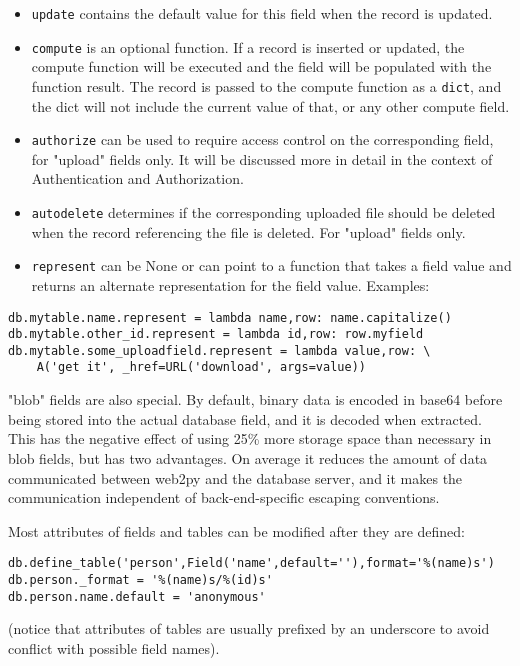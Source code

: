 \documentclass[justified,sixbynine,notoc]{tufte-book}
\def\ft{\small\tt}
\def\inxx#1{\index{#1}}
\begin{document}
\begin{fullwidth}
\begin{itemize}
\item {\ft update} contains the default value for this field when the record is updated.

\item {\ft compute} is an optional function. If a record is inserted or updated, the compute function will be executed and the field will be populated with the function result. The record is passed to the compute function as a {\ft dict}, and the dict will not include the current value of that, or any other compute field.

\item {\ft authorize} can be used to require access control on the corresponding field, for "upload" fields only. It will be discussed more in detail in the context of Authentication and Authorization.

\item {\ft autodelete} determines if the corresponding uploaded file should be deleted when the record referencing the file is deleted. For "upload" fields only.

\item {\ft represent} can be None or can point to a function that takes a field value and returns an alternate representation for the field value. Examples:
\end{itemize}
\begin{lstlisting}
db.mytable.name.represent = lambda name,row: name.capitalize()
db.mytable.other_id.represent = lambda id,row: row.myfield
db.mytable.some_uploadfield.represent = lambda value,row: \
    A('get it', _href=URL('download', args=value))
\end{lstlisting}

\inxx{blob}
"blob" fields are also special. By default, binary data is encoded in base64 before being stored into the actual database field, and it is decoded when extracted. This has the negative effect of using 25\% more storage space than necessary in blob fields, but has two advantages. On average it reduces the amount of data communicated between web2py and the database server, and it makes the communication independent of back-end-specific escaping conventions.

Most attributes of fields and tables can be modified after they are defined:

\begin{lstlisting}
db.define_table('person',Field('name',default=''),format='%(name)s')
db.person._format = '%(name)s/%(id)s'
db.person.name.default = 'anonymous'
\end{lstlisting}
(notice that attributes of tables are usually prefixed by an underscore to avoid conflict with possible field names).


\end{fullwidth}
\end{document}
